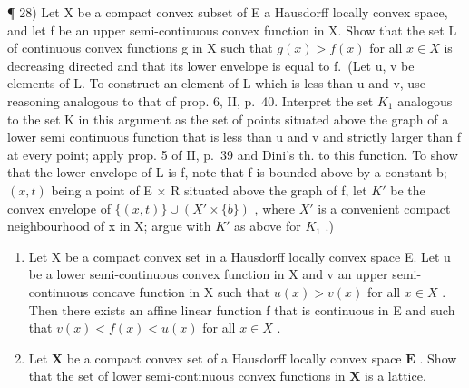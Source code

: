 ¶ 28) Let X be a compact convex subset of E a Hausdorff locally convex space, and let f be an upper semi-continuous convex function in X. Show that the set L of continuous convex functions g in X such that \(g(x) > f(x)\) for all \(x \in X\) is decreasing directed and that its lower envelope is equal to f.~(Let u, v be elements of L. To construct an element of L which is less than u and v, use reasoning analogous to that of prop. 6, II, p.~40. Interpret the set \(K_{1}\) analogous to the set K in this argument as the set of points situated above the graph of a lower semi continuous function that is less than u and v and strictly larger than f at every point; apply prop. 5 of II, p.~39 and Dini's th. to this function. To show that the lower envelope of L is f, note that f is bounded above by a constant b; \((x, t)\) being a point of E × R situated above the graph of f, let \(K'\) be the convex envelope of \(\{(x, t)\} \cup (X' \times \{b\})\) , where \(X'\) is a convenient compact neighbourhood of x in X; argue with \(K'\) as above for \(K_{1}\) .)

\begin{enumerate}
\def\labelenumi{\arabic{enumi})}
\setcounter{enumi}{28}
\item
  Let X be a compact convex set in a Hausdorff locally convex space E. Let u be a lower semi-continuous convex function in X and v an upper semi-continuous concave function in X such that \(u(x) > v(x)\) for all \(x \in X\) . Then there exists an affine linear function f that is continuous in E and such that \(v(x) < f(x) < u(x)\) for all \(x \in X\) .
\item
  Let \(\mathbf{X}\) be a compact convex set of a Hausdorff locally convex space \(\mathbf{E}\) . Show that the set of lower semi-continuous convex functions in \(\mathbf{X}\) is a lattice.
\end{enumerate}
\relax{}

